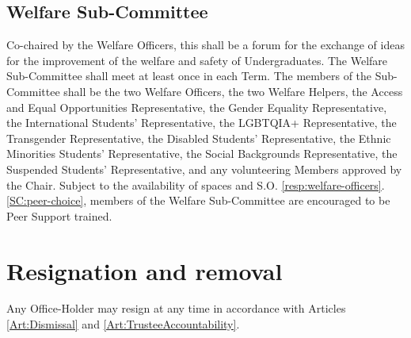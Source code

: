 \subsection{Welfare Sub-Committee} \label{ssec:welfare-committee}
\npara Co-chaired by the Welfare Officers, this shall be a forum for the exchange of ideas for the improvement of the welfare and safety of Undergraduates.
\npara The Welfare Sub-Committee shall meet at least once in each Term.
\npara The members of the Sub-Committee shall be the two Welfare Officers, the two Welfare Helpers, the Access and Equal Opportunities Representative, the Gender Equality Representative, the International Students’ Representative, the LGBTQIA+ Representative, the Transgender Representative, the Disabled Students’ Representative, the Ethnic Minorities Students' Representative, the Social Backgrounds Representative, the Suspended Students' Representative, and any volunteering Members approved by the Chair.
\npara Subject to the availability of spaces and S.O. \ref{resp:welfare-officers}.\ref{SC:peer-choice}, members of the Welfare Sub-Committee are encouraged to be Peer Support trained.
\section{Resignation and removal} \label{ch:ResignationRemoval}
\npara Any Office-Holder may resign at any time in accordance with Articles \ref{Art:Dismissal} and \ref{Art:TrusteeAccountability}.

